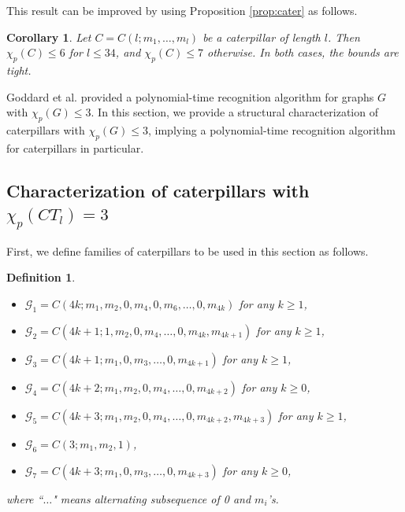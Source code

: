 \documentclass{article}
\newtheorem{definition}{Definition}
\newtheorem{corollary}{Corollary}
\begin{document}
This result can be improved by using Proposition \ref{prop:cater} as follows.
\begin{corollary}
    Let $C=C(l;m_1,\ldots,m_l)$ be a caterpillar of length $l$. Then $\chi_p(C)\leq 6$ for $l\leq 34$, and $\chi_p(C)\leq 7$ otherwise. In both cases, the bounds are tight.
\end{corollary}
    
Goddard et al. \cite{goddard2008broadcast} provided a polynomial-time recognition algorithm for graphs $G$ with $\chi_p(G)\leq 3$. In this section, we provide a structural characterization of caterpillars with $\chi_p(G)\leq 3$, implying a polynomial-time recognition algorithm for caterpillars in particular. 

\subsection{Characterization of caterpillars with $\chi_p(CT_l)=3$}\label{sec:char3}

First, we define families of caterpillars to be used in this section as follows.
\begin{definition}
~~
    \begin{itemize}
        \item $\mathcal{G}_1=C(4k; m_1, m_2, 0,m_4,0, m_6, \ldots,0,m_{4k})$ for any $k\geq 1$,
        \item $\mathcal{G}_2=C(4k+1; 1, m_2,0,m_4,\ldots,0,m_{4k},m_{4k+1})$ for any $k\geq 1$,
        \item $\mathcal{G}_3=C(4k+1; m_1, 0,m_3,\ldots, 0,m_{4k+1})$ for any $k\geq 1$,
    \item $\mathcal{G}_4=C(4k+2; m_1, m_2,0,m_4,\ldots, 0,m_{4k+2})$ for any $k\geq 0$,
    \item $\mathcal{G}_5=C(4k+3; m_1, m_2, 0, m_4, \ldots, 0, m_{4k+2},m_{4k+3})$ for any $k\geq 1$,
    \item $\mathcal{G}_6=C(3; m_1,m_2,1)$,
    \item $\mathcal{G}_7=C(4k+3;m_1,0,m_3,\ldots, 0,m_{4k+3})$ for any $k\geq 0$,
    \end{itemize}
    where ``$\ldots$" means alternating subsequence of 0 and $m_i$'s.
\end{definition}
\end{document}
